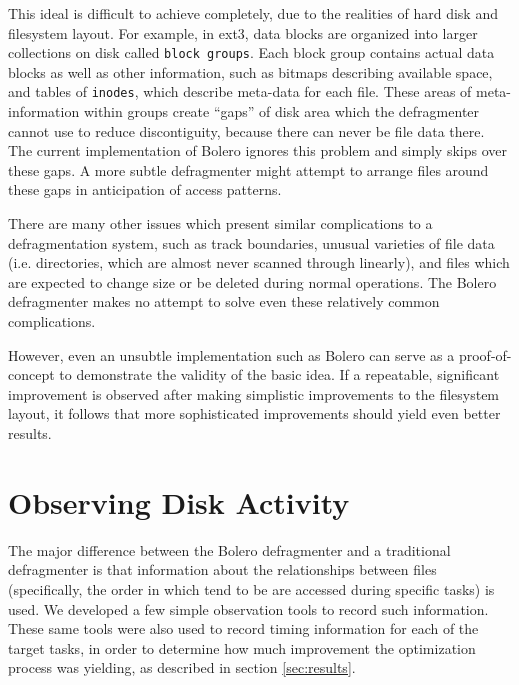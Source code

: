\documentclass[10pt,twocolumn,letterpaper]{article}
\begin{document}
This ideal is difficult to achieve completely, due to the realities of hard disk
and filesystem layout. For example, in ext3, data blocks are organized into larger
collections on disk called \texttt{block groups}\cite{ext2intro}. Each
block group contains actual data blocks as well as other information, such
as bitmaps describing available space, and tables of \texttt{inodes},
which describe meta-data for each file. These areas of meta-information within
groups create ``gaps'' of disk area which the defragmenter cannot
use to reduce discontiguity, because there can never be file data there.
The current implementation of Bolero ignores this problem and simply
skips over these gaps. A more subtle defragmenter might attempt to arrange
files around these gaps in anticipation of access patterns.

There are many other issues which present similar complications to a defragmentation
system, such as track boundaries, unusual varieties of file data (i.e. directories, which
are almost never scanned through linearly), and files which are expected to change
size or be deleted during normal operations. The Bolero defragmenter makes no attempt to
solve even these relatively common complications.

However, even an unsubtle implementation such as Bolero can serve as a proof-of-concept
to demonstrate the validity of the basic idea. If a repeatable, significant improvement
is observed after making simplistic improvements to the filesystem layout, it follows
that more sophisticated improvements should yield even better results.

\section{Observing Disk Activity}\label{sec:observing}

The major difference between the Bolero defragmenter and a traditional defragmenter
is that information about the relationships between files (specifically, the order
in which tend to be are accessed during specific tasks) is used. We developed a few
simple observation tools to record such information. These same tools were also used to record
timing information for each of the target tasks, in order to determine how much improvement
the optimization process was yielding, as described in section \ref{sec:results}.
\end{document}
